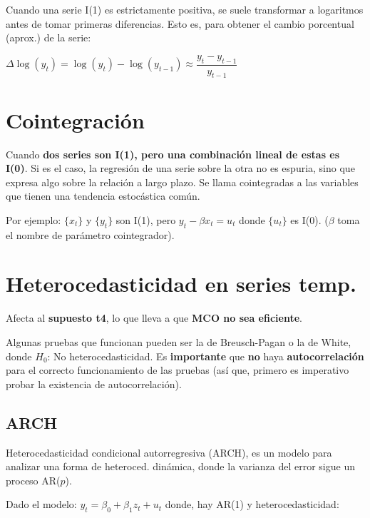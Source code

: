\documentclass[10pt, a4paper, landscape]{extarticle}
\begin{document}
\begin{multicols}{3}
\begin{multicols}{2}
\end{multicols}

Cuando una serie I(1) es estrictamente positiva, se suele transformar a logaritmos antes de tomar primeras diferencias. Esto es, para obtener el cambio porcentual (aprox.) de la serie:

\begin{center}
	$\Delta \log(y_t) = \log(y_t) - \log(y_{t - 1}) \approx \dfrac{y_t - y_{t - 1}}{y_{t - 1}}$
\end{center}

\columnbreak

\section*{Cointegración}

Cuando \textbf{dos series son I(1), pero una combinación lineal de estas es I(0)}. Si es el caso, la regresión de una serie sobre la otra no es espuria, sino que expresa algo sobre la relación a largo plazo. Se llama cointegradas a las variables que tienen una tendencia estocástica común.

Por ejemplo: $\lbrace x_t \rbrace$ y $\lbrace y_t \rbrace$ son I(1), pero $y_t - \beta x_t = u_t$ donde $\lbrace u_t \rbrace$ es I(0). ($\beta$ toma el nombre de parámetro cointegrador).

\section*{Heterocedasticidad en series temp.}

Afecta al \textbf{supuesto t4}, lo que lleva a que \textbf{MCO no sea eficiente}.

Algunas pruebas que funcionan pueden ser la de Breusch-Pagan o la de White, donde $H_0$: No heterocedasticidad. Es \textbf{importante} que \textbf{no} haya \textbf{autocorrelación} para el correcto funcionamiento de las pruebas (así que, primero es imperativo probar la existencia de autocorrelación).

\subsection*{ARCH}

Heterocedasticidad condicional autorregresiva (ARCH), es un modelo para analizar una forma de heteroced. dinámica, donde la varianza del error sigue un proceso AR($p$).

Dado el modelo: $y_t = \beta_0 + \beta_1 z_t + u_t$	donde, hay AR(1) y heterocedasticidad:


\end{multicols}
\end{document}

